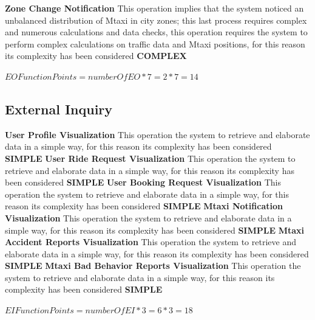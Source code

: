\documentclass[11pt,titlepage]{article} %
\begin{document}
      \textbf{Zone Change Notification}\newline
      This operation implies that the system noticed an unbalanced distribution of Mtaxi in city zones; this last process requires complex and numerous
      calculations and data checks, this operation requires the system to perform complex calculations on traffic data and Mtaxi positions, for this reason its complexity has been considered \textbf{COMPLEX}\newline
      \begin{center}
	$ EO Function Points = numberOfEO * 7 = 2 * 7 = 14 $
      \end{center}
      
    \subsection{External Inquiry}
       \textbf{User Profile Visualization}\newline
       This operation the system to retrieve and elaborate data in a simple way, for this reason its complexity has been considered \textbf{SIMPLE}\newline\newline
       \textbf{User Ride Request Visualization}\newline
       This operation the system to retrieve and elaborate data in a simple way, for this reason its complexity has been considered \textbf{SIMPLE}\newline\newline
       \textbf{User Booking Request Visualization}\newline
       This operation the system to retrieve and elaborate data in a simple way, for this reason its complexity has been considered \textbf{SIMPLE}\newline\newline
       \textbf{Mtaxi Notification Visualization}\newline
       This operation the system to retrieve and elaborate data in a simple way, for this reason its complexity has been considered \textbf{SIMPLE}\newline\newline
       \textbf{Mtaxi Accident Reports Visualization}\newline
       This operation the system to retrieve and elaborate data in a simple way, for this reason its complexity has been considered \textbf{SIMPLE}\newline\newline
       \textbf{Mtaxi Bad Behavior Reports Visualization}\newline
       This operation the system to retrieve and elaborate data in a simple way, for this reason its complexity has been considered \textbf{SIMPLE}\newline
       \begin{center}
	$ EI Function Points = numberOfEI * 3 = 6 * 3 = 18 $
       \end{center}
     
\end{document}
